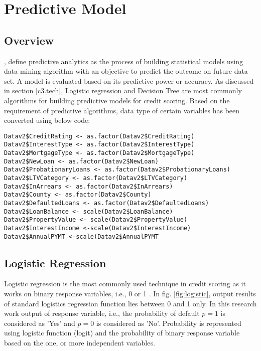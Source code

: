 \section{Predictive Model}

\subsection{Overview}
\cite{shmueli2011predictive}, define predictive analytics as the process of building statistical models using data mining algorithm with an objective to predict the outcome on future data set. A model is evaluated based on its predictive power or accuracy. As discussed in section \ref{c3.tech}, Logistic regression and Decision Tree are most commonly algorithms for building predictive models for credit scoring. Based on the requirement of predictive algorithms, data type of certain variables has been converted using below code:

\begin{verbatim}
Datav2$CreditRating <- as.factor(Datav2$CreditRating)
Datav2$InterestType <- as.factor(Datav2$InterestType)
Datav2$MortgageType <- as.factor(Datav2$MortgageType)
Datav2$NewLoan <- as.factor(Datav2$NewLoan)
Datav2$ProbationaryLoans <- as.factor(Datav2$ProbationaryLoans)
Datav2$LTVCategory <- as.factor(Datav2$LTVCategory)
Datav2$InArrears <- as.factor(Datav2$InArrears)
Datav2$County <- as.factor(Datav2$County)
Datav2$DefaultedLoans <- as.factor(Datav2$DefaultedLoans)
Datav2$LoanBalance <- scale(Datav2$LoanBalance)
Datav2$PropertyValue <- scale(Datav2$PropertyValue)
Datav2$InterestIncome <-scale(Datav2$InterestIncome)
Datav2$AnnualPYMT <-scale(Datav2$AnnualPYMT
\end{verbatim}

\subsection{Logistic Regression}

Logistic regression is the most commonly used technique in credit scoring as it works on binary response variables, i.e., 0 or 1 \citep{hilbe2011logistic}. In fig. \ref{fig:logistic}, output results of standard logistics regression function lies between 0 and 1 only. In this research work output of response variable, i.e., the probability of default $p=1$ is considered as 'Yes' and $p=0$ is considered as 'No'. Probability is represented using logistic function (logit) and the probability of binary response variable based on the one, or more independent variables.

